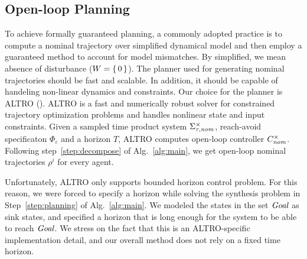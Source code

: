 

\subsection{Open-loop Planning}
To achieve formally guaranteed planning, a commonly adopted practice is to compute a nominal trajectory over simplified dynamical model and then employ a guaranteed method to account for model mismatches. By simplified, we mean absence of disturbance ($W=\set{0}$). The planner used for generating nominal trajectories should be fast and scalable. In addition, it should be capable of handeling non-linear dynamics and constraints. Our choice for the planner is ALTRO (\cite{howell2019altro}). ALTRO is a fast and numerically robust solver for constrained trajectory optimization problems and handles nonlinear state and input constraints. Given a sampled time product system $\Sigma_{\tau,\mathit{nom}}^\times$, reach-avoid specificaton $\Phi_\varepsilon$ and a horizon $T$, ALTRO computes open-loop controller $C^\times_{\mathit{nom}}$. Following step~\ref{step:decompose} of Alg.~\ref{alg:main}, we get open-loop nominal trajectories $\rho^i$ for every agent.
\begin{remark}
	Unfortunately, ALTRO only supports bounded horizon control problem.
	For this reason, we were forced to specify a horizon while solving the synthesis problem in Step~\ref{step:planning} of Alg.~\ref{alg:main}.
	We modeled the states in the set $\mathit{Goal}$ as sink states, and specified a horizon that is long enough for the system to be able to reach $\mathit{Goal}$.
	We stress on the fact that this is an ALTRO-specific implementation detail, and our overall method does not rely on a fixed time horizon.
\end{remark}

